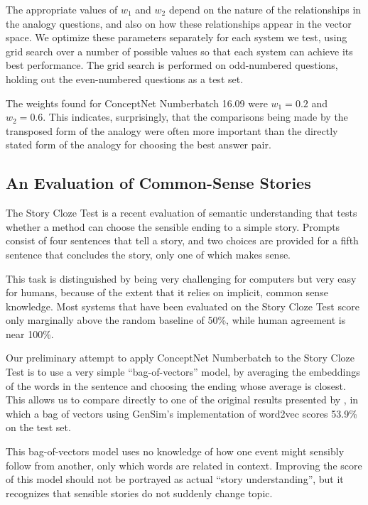 \documentclass[letterpaper]{article}
\begin{document}
The appropriate values of $w_1$ and $w_2$ depend on the nature of the
relationships in the analogy questions, and also on how these relationships
appear in the vector space. We optimize these parameters separately for each
system we test, using grid search over a number of possible values so that each
system can achieve its best performance. The grid search is performed on
odd-numbered questions, holding out the even-numbered questions as a test set.

The weights found for ConceptNet Numberbatch 16.09 were $w_1 = 0.2$ and $w_2 =
0.6$.  This indicates, surprisingly, that the comparisons being made by the
transposed form of the analogy were often more important than the directly
stated form of the analogy for choosing the best answer pair.

\subsection{An Evaluation of Common-Sense Stories}
\label{story-evaluation}

The Story Cloze Test \cite{mostafazadeh2016cloze} is a recent evaluation of
semantic understanding that tests whether a method can choose the sensible
ending to a simple story. Prompts consist of four sentences that tell a story,
and two choices are provided for a fifth sentence that concludes the story,
only one of which makes sense.

This task is distinguished by being very challenging for computers but very
easy for humans, because of the extent that it relies on implicit, common sense
knowledge. Most systems that have been evaluated on the Story Cloze Test
score only marginally above the random baseline of 50\%, while human
agreement is near 100\%.

Our preliminary attempt to apply ConceptNet Numberbatch to the Story Cloze Test
is to use a very simple ``bag-of-vectors'' model, by averaging the
embeddings of the words in the sentence and choosing the ending whose average is
closest. This allows us to compare directly to one of the original results presented by
\citeauthor{mostafazadeh2016cloze}, in which a bag of vectors using GenSim's
implementation of word2vec scores 53.9\% on the test set.

This bag-of-vectors model uses no knowledge of how one event might sensibly
follow from another, only which words are related in context. Improving the
score of this model should not be portrayed as actual ``story understanding'',
but it recognizes that sensible stories do not suddenly change topic.
\end{document}
